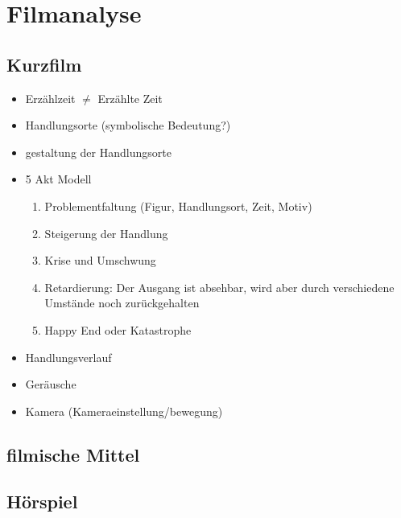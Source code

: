 
\section{Filmanalyse}


\subsection{Kurzfilm}

\begin{itemize}
    \item Erzählzeit $\neq$ Erzählte Zeit
    \item Handlungsorte (symbolische Bedeutung?)
    \item gestaltung der Handlungsorte
    \item 5 Akt Modell
    \begin{enumerate}
        \item Problementfaltung (Figur, Handlungsort, Zeit, Motiv)
        \item Steigerung der Handlung
        \item Krise und Umschwung
        \item Retardierung: Der Ausgang ist absehbar, wird aber durch verschiedene Umstände noch zurückgehalten
        \item Happy End oder Katastrophe
    \end{enumerate}
    \item Handlungsverlauf
    \item Geräusche
    \item Kamera (Kameraeinstellung/bewegung)
\end{itemize}

\subsection{filmische Mittel}


\subsection{Hörspiel}


